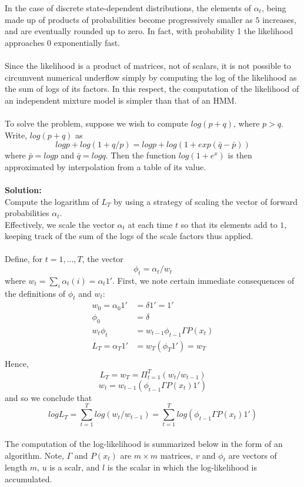 \documentclass{article}
\begin{document}
In the case of discrete state-dependent distributions, the elements of $\alpha_t$, being made up of products of probabilities become progressively smaller as $5$ increases, and are eventually rounded up to zero. In fact, with probability 1 the likelihood approaches 0 exponentially fast. \\
\\
Since the likelihood is a product of matrices, not of scalars, it is not possible to circumvent numerical underflow simply by computing the log of the likelihood as the sum of logs of its factors. In this respect, the computation of the likelihood of an independent mixture model is simpler than that of an HMM. \\
\\
To solve the problem, suppose we wish to compute $log(p+q)$, where $p > q$. Write, $log(p+q)$ as
$$log p + log(1+ q/p) = log p + log(1 + exp(\bar{q} - \bar{p}))$$
where $\bar{p} = log p$ and $\bar{q} = log q$. Then the function $log(1+e^x)$ is then approximated by interpolation from a table of its value. \\
\\
\textbf{Solution:}\\
Compute the logarithm of $L_T$ by using a strategy of scaling the vector of forward probabilities $\alpha_t$. \\
Effectively, we scale the vector $\alpha_t$ at each time $t$ so that its elements add to $1$, keeping track of the sum of the logs of the scale factors thus applied. \\
\\
Define, for $t = 1, ..., T$, the vector
$$\phi_t = \alpha_t / w_t$$
where $w_t = \sum_i \alpha_t(i) = \alpha_t 1'$. First, we note certain immediate consequences of the definitions of $\phi_t$ and $w_t$:
\begin{align}
w_0 = \alpha_0 1' & = \delta 1' = 1' \\
\phi_0 & = \delta\\
w_t \phi_t & = w_{t-1} \phi_{t-1} \Gamma P(x_t) \\
L_T = \alpha_T 1' & = w_T (\phi_T 1') = w_T \\
\end{align}
Hence,
$$L_T = w_T = \Pi_{t=1}^T (w_t / w_{t-1})$$
$$w_t = w_{t-1} (\phi_{t-1} \Gamma P(x_t) 1')$$
and so we conclude that
$$log L_T = \sum_{t=1}^T log(w_t / w_{t-1}) = \sum_{t=1}^T log(\phi_{t-1} \Gamma P(x_t) 1')$$
\\
The computation of the log-likelihood is summarized below in the form of an algorithm. Note, $\Gamma$ and $P(x_t)$ are $m \times m$ matrices, $v$ and $\phi_t$ are vectors of length $m$, $u$ is a scalr, and $l$ is the scalar in which the log-likelihood is accumulated.
\end{document}
